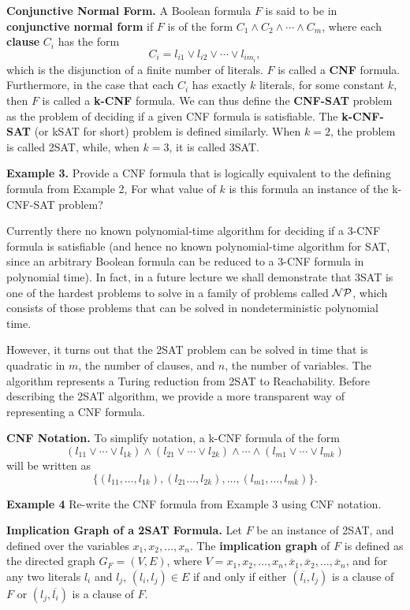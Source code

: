 \documentclass [12pt]{article}
\theoremstyle{definition}
\begin{document}
{\bf Conjunctive Normal Form.} A Boolean formula $F$ is said to be in {\bf conjunctive
normal form} if $F$ is of the form $C_{1}\wedge C_{2}\wedge\cdots\wedge C_{m}$, where each
{\bf clause} $C_{i}$ has the form  
\[C_{i}=l_{i1}\vee l_{i2}\vee\cdots\vee l_{im_{i}},\]
which is the disjunction of a finite number of literals. $F$ is called a {\bf CNF} formula.
Furthermore, in the case that each $C_{i}$ has exactly $k$ literals, for some constant $k$,
then $F$ is called a {\bf k-CNF} formula. We can thus define the \textbf{CNF-SAT} problem
as the problem of deciding if a given CNF formula is satisfiable. 
The \textbf{k-CNF-SAT} (or kSAT for short) problem is defined similarly. When $k=2$, the problem is called 2SAT,
while, when $k=3$, it is called 3SAT.

\textbf{Example 3.} Provide a CNF formula that is logically equivalent to the defining formula
from Example 2, For what value of $k$ is this formula an instance of the k-CNF-SAT problem?

\newpage
\noindent
Currently there no known polynomial-time algorithm for deciding if a 3-CNF formula is satisfiable
(and hence no known polynomial-time algorithm for SAT,
since an arbitrary Boolean formula can be reduced to a 3-CNF formula in polynomial time).
In fact, in a future lecture we shall demonstrate that 3SAT is one of the hardest problems to 
solve in a family of problems called ${\cal NP}$, which consists of those problems that can be
solved in nondeterministic polynomial time.

However, it turns out that the 2SAT problem can be solved in time that is quadratic in
$m$, the number of clauses, and $n$, the number of variables. The algorithm represents a Turing reduction from 2SAT to Reachability.
Before describing the 2SAT algorithm, we provide a more transparent way of representing a CNF formula.

{\bf CNF Notation.} To simplify notation, a k-CNF formula of the form 
\[(l_{11}\vee\cdots\vee l_{1k})\wedge (l_{21}\vee\cdots\vee l_{2k})\wedge\cdots\wedge 
(l_{m1}\vee\cdots\vee l_{mk})\]
will be written as 
\[\{(l_{11},\ldots,l_{1k}),(l_{21}\ldots,l_{2k}),\ldots,(l_{m1},\ldots ,l_{mk})\}.\]

{\bf Example 4} Re-write the CNF formula from Example 3 using CNF notation.

\vspace{1.0in}
\noindent

{\bf Implication Graph of a 2SAT Formula.} Let $F$ be an instance of 2SAT, and defined over the variables
$x_{1},x_{2},\ldots ,x_{n}$. The {\bf implication graph} of $F$ is defined as the directed graph 
$G_{F}=(V,E)$, where $V=x_{1},x_{2},\ldots ,x_{n},\overline{x}_{1},\overline{x}_{2},\ldots ,\overline{x}_{n}$,
and for any two literals $l_{i}$ and $l_{j}$, 
 $(l_{i},l_{j})\in E$ if and only if either $(\overline{l_{i}},l_{j})$ is a clause of $F$
or $(l_{j},\overline{l_{i}})$ is a clause of $F$. 
\end{document}
